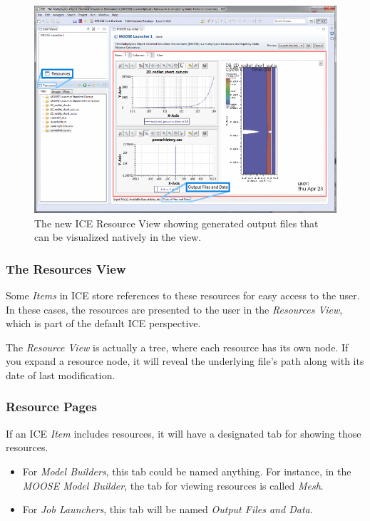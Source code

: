 \begin{figure}[htbp]
\centering
\includegraphics[width=\textwidth]{figures/ICE_Viz_ResourceViewPage.png}
\caption{The new ICE Resource View showing generated output files that can be visualized natively in the view. }
\end{figure}

\subsubsection{The Resources View}\label{the-resources-view}

Some \emph{Items} in ICE store references to these resources for easy
access to the user. In these cases, the resources are presented to the
user in the \emph{Resources View}, which is part of the default ICE
perspective.

The \emph{Resource View} is actually a tree, where each resource has its
own node. If you expand a resource node, it will reveal the underlying
file's path along with its date of last modification.

\subsubsection{Resource Pages}\label{resource-pages}

If an ICE \emph{Item} includes resources, it will have a designated tab
for showing those resources.

\begin{itemize}
\itemsep1pt\parskip0pt
\item
  For \emph{Model Builders}, this tab could be named anything. For
  instance, in the \emph{MOOSE Model Builder}, the tab for viewing
  resources is called \emph{Mesh}.
\item
  For \emph{Job Launchers}, this tab will be named \emph{Output Files
  and Data}.
\end{itemize}

